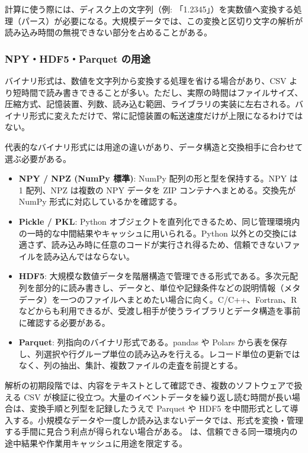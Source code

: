 計算に使う際には、ディスク上の文字列（例: 「1.2345」）を実数値へ変換する処理（パース）が必要になる。大規模データでは、この変換と区切り文字の解析が読み込み時間の無視できない部分を占めることがある。

\subsubsection{NPY・HDF5・Parquet の用途}
バイナリ形式は、数値を文字列から変換する処理を省ける場合があり、CSV より短時間で読み書きできることが多い。ただし、実際の時間はファイルサイズ、圧縮方式、記憶装置、列数、読み込む範囲、ライブラリの実装に左右される。バイナリ形式に変えただけで、常に記憶装置の転送速度だけが上限になるわけではない。

代表的なバイナリ形式には用途の違いがあり、データ構造と交換相手に合わせて選ぶ必要がある。

\begin{itemize}
    \item \textbf{NPY / NPZ (NumPy 標準)}: NumPy 配列の形と型を保持する。NPY は 1 配列、NPZ は複数の NPY データを ZIP コンテナへまとめる。交換先が NumPy 形式に対応しているかを確認する。
    \item \textbf{Pickle / PKL}: Python オブジェクトを直列化できるため、同じ管理環境内の一時的な中間結果やキャッシュに用いられる。Python 以外との交換には適さず、読み込み時に任意のコードが実行され得るため、信頼できないファイルを読み込んではならない。
    \item \textbf{HDF5}: 大規模な数値データを階層構造で管理できる形式である。多次元配列を部分的に読み書きし、データと、単位や記録条件などの説明情報（メタデータ）を一つのファイルへまとめたい場合に向く。C/C++、Fortran、R などからも利用できるが、受渡し相手が使うライブラリとデータ構造を事前に確認する必要がある。
    \item \textbf{Parquet}: 列指向のバイナリ形式である。pandas や Polars から表を保存し、列選択や行グループ単位の読み込みを行える。レコード単位の更新ではなく、列の抽出、集計、複数ファイルの走査を前提とする。
\end{itemize}

解析の初期段階では、内容をテキストとして確認でき、複数のソフトウェアで扱える CSV が検証に役立つ。大量のイベントデータを繰り返し読む時間が長い場合は、変換手順と列型を記録したうえで Parquet や HDF5 を中間形式として導入する。小規模なデータや一度しか読み込まないデータでは、形式を変換・管理する手間に見合う利点が得られない場合がある。 は、信頼できる同一環境内の途中結果や作業用キャッシュに用途を限定する。

